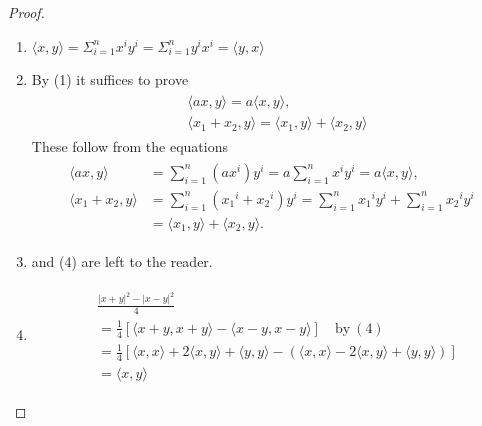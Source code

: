 \begin{proof}
    \begin{enumerate}[label={\upshape(\arabic*)}]
        \item $\langle x,y\rangle=\Sigma_{i=1}^{n}x^{i}y^{i}=\Sigma_{i=1}^{n}y^{i}x^{i}=\langle y,x\rangle $
        \item By (1) it suffices to prove
            \begin{align*}\begin{aligned}
                & \langle ax,y\rangle = {a\langle x,y\rangle,}\\
                & \langle x_{1}+x_{2}, y\rangle = \langle x_{1},y\rangle+\langle x_{2},y\rangle
            \end{aligned}\end{align*}
            These follow from the equations
            \begin{align*}\begin{aligned}
                \langle ax,y\rangle
                    & =\sum_{i=1}^{n}(ax^{i})y^{i}
                        = a\sum_{i=1}^{n}x^{i}y^{i}=a\langle x,y\rangle,\\
                \langle x_{1}+x_{2},y\rangle
                    & =\sum_{i=1}^{n}(x_{1}{}^{i}+x_{2}{}^{i})y^{i}
                        = \sum_{i=1}^{n}x_{1}{}^{i}y^{i}+\sum_{i=1}^{n}x_{2}{}^{i}y^{i} \\
                    & = \langle x_{1},y\rangle+\langle x_{2},y\rangle.
            \end{aligned}\end{align*}
        \item and (4) are left to the reader.
        \item \quad \vspace*{-2em}
            \begin{align*}\begin{aligned}
                & \frac{|x+y|^2-|x-y|^2}4 \\
                & = \frac14[\langle x+y,x+y\rangle-\langle x-y,x-y\rangle]\quad\mathrm{by~}(4) \\
                & = \frac14[\langle x,x\rangle+2\langle x,y\rangle+\langle y,y\rangle-(\langle x,x\rangle-2\langle x,y\rangle+\langle y,y\rangle)] \\
                & = \langle x,y\rangle
            \end{aligned}\end{align*}
    \end{enumerate}
\end{proof}

